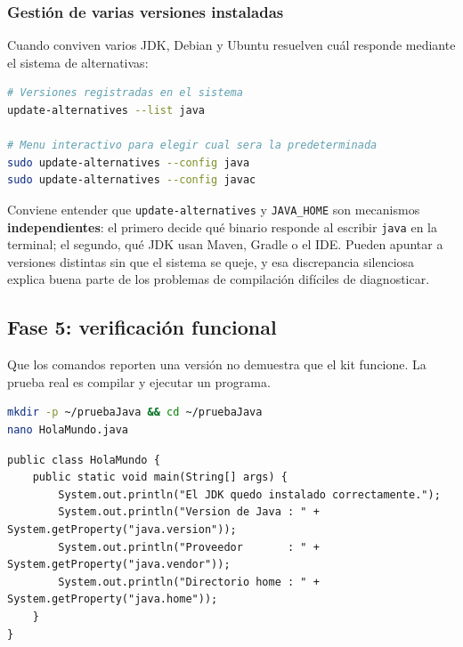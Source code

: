 
\subsubsection{Gestión de varias versiones instaladas}

Cuando conviven varios JDK, Debian y Ubuntu resuelven cuál responde mediante el sistema
de alternativas:

\begin{lstlisting}[language=bash,caption={Selección de la versión activa},morekeywords={sudo,update-alternatives,config,list,java,javac}]
# Versiones registradas en el sistema
update-alternatives --list java

# Menu interactivo para elegir cual sera la predeterminada
sudo update-alternatives --config java
sudo update-alternatives --config javac
\end{lstlisting}

Conviene entender que \texttt{update-alternatives} y \texttt{JAVA\_HOME} son mecanismos
\textbf{independientes}: el primero decide qué binario responde al escribir
\texttt{java} en la terminal; el segundo, qué JDK usan Maven, Gradle o el IDE. Pueden
apuntar a versiones distintas sin que el sistema se queje, y esa discrepancia silenciosa
explica buena parte de los problemas de compilación difíciles de diagnosticar.


\subsection{Fase 5: verificación funcional}

Que los comandos reporten una versión no demuestra que el kit funcione. La prueba real
es compilar y ejecutar un programa.

\begin{lstlisting}[language=bash,caption={Creación del programa de prueba},morekeywords={mkdir,cd,cat,nano}]
mkdir -p ~/pruebaJava && cd ~/pruebaJava
nano HolaMundo.java
\end{lstlisting}

\begin{lstlisting}[caption={Programa de prueba (\texttt{HolaMundo.java})}]
public class HolaMundo {
    public static void main(String[] args) {
        System.out.println("El JDK quedo instalado correctamente.");
        System.out.println("Version de Java : " + System.getProperty("java.version"));
        System.out.println("Proveedor       : " + System.getProperty("java.vendor"));
        System.out.println("Directorio home : " + System.getProperty("java.home"));
    }
}
\end{lstlisting}

